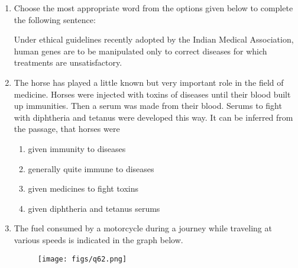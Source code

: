 \documentclass[a4paper, 11pt]{article}
\begin{document}
\begin{enumerate}
    \item Choose the most appropriate word from the options given below to complete the following sentence:
    
    Under ethical guidelines recently adopted by the Indian Medical Association, human genes are to be manipulated only to correct diseases for which \underline{\hspace{2cm}} treatments are unsatisfactory.
    
    \begin{enumerate}
    \end{enumerate}
    
    \hfill{}

    \item The horse has played a little known but very important role in the field of medicine. Horses were injected with toxins of diseases until their blood built up immunities. Then a serum was made from their blood. Serums to fight with diphtheria and tetanus were developed this way. It can be inferred from the passage, that horses were
    
    \begin{enumerate}
        \item given immunity to diseases
        \item generally quite immune to diseases
        \item given medicines to fight toxins
        \item given diphtheria and tetanus serums
    \end{enumerate}
    
    \hfill{}

    \item The fuel consumed by a motorcycle during a journey while traveling at various speeds is indicated in the graph below.
    
    \begin{figure}[H]
        \centering
        \texttt{[image: figs/q62.png]}
        \caption*{}
        \label{fig:q62_graph}
    \end{figure}
    

\end{enumerate}
\end{document}

